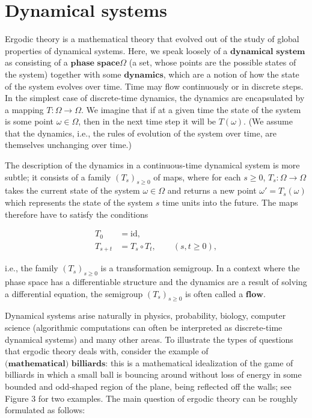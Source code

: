 

\chapter{Dynamical systems}
Ergodic theory is a mathematical theory that evolved
out of the study of global properties of dynamical
systems. Here, we speak loosely of a
$\textbf{dynamical system}$ as consisting of a
$\textbf{phase space}$$\Omega$ (a set, whose points
are the possible states of the system) together with
some $\textbf{dynamics}$, which are a notion of how
the state of the system evolves over time. Time may
flow continuously or in discrete steps. In the
simplest case of discrete-time dynamics, the dynamics
are encapsulated by a mapping $T:\Omega\to \Omega$.
We imagine that if at a given time the state of the
system is some point $\omega \in \Omega$, then in the
next time step it will be $T(\omega)$. (We assume
that the dynamics, i.e., the rules of evolution of the
system over time, are themselves unchanging over
time.)

The description of the dynamics in a continuous-time
dynamical system is more subtle; it consists of a
family $(T_s)_{s\ge 0}$ of maps, where for each
$s\ge 0$, $T_s:\Omega\to \Omega$ takes the current
state of the system $\omega\in \Omega$ and returns a
new point $\omega'=T_s(\omega)$ which represents the
state of the system $s$ time units into the future.
The maps therefore have to satisfy the conditions

\begin{align*}
T_0 &= \textrm{id}, \\
T_{s+t} &= T_s \circ T_t, \qquad (s,t\ge 0),
\end{align*}

\noindent i.e., the family $(T_s)_{s\ge 0}$ is a transformation
semigroup. In a context where the phase space has a
differentiable structure and the dynamics are a result
of solving a differential equation, the semigroup
$(T_s)_{s\ge0}$ is often called a $\textbf{flow}$.

Dynamical systems arise naturally in physics,
probability, biology, computer science (algorithmic
computations can often be interpreted as discrete-time
dynamical systems) and many other areas. To illustrate
the types of questions that ergodic theory deals with,
consider the example of
$\textbf{(mathematical) billiards}$: this is a
mathematical idealization of the game of billiards in
which a small ball is bouncing around without loss of
energy in some bounded and odd-shaped region of the
plane, being reflected off the walls; see Figure 3 for
two examples. The main question of ergodic theory can
be roughly formulated as follows:

